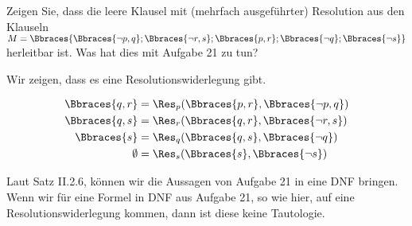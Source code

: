 
\begin{exercise}[40]

Zeigen Sie, dass die leere Klausel mit (mehrfach ausgeführter) Resolution aus den Klauseln $M = \Bbraces{\Bbraces{\neg p, q}; \Bbraces{\neg r, s}; \Bbraces{p, r}; \Bbraces{\neg q}; \Bbraces{\neg s}}$ herleitbar ist.
Was hat dies mit Aufgabe 21 zu tun?

\end{exercise}


\begin{solution}

\phantom{}


Wir zeigen, dass es eine Resolutionswiderlegung gibt.

\begin{align*}
    \Bbraces{q, r}
    & =
    \Res_p(\Bbraces{p, r}, \Bbraces{\neg p, q}) \\
    \Bbraces{q, s}
    & =
    \Res_r(\Bbraces{q, r}, \Bbraces{\neg r, s}) \\
    \Bbraces{s}
    & =
    \Res_q(\Bbraces{q, s}, \Bbraces{\neg q}) \\
    \emptyset
    & =
    \Res_s(\Bbraces{s}, \Bbraces{\neg s})
\end{align*}


Laut Satz II.2.6, können wir die Aussagen von Aufgabe 21 in eine DNF bringen.
Wenn wir für eine Formel in DNF aus Aufgabe 21, so wie hier, auf eine Resolutionswiderlegung kommen, dann ist diese keine Tautologie.

\end{solution}


